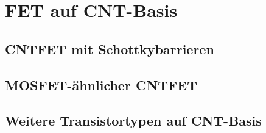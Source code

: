 \section{FET auf CNT-Basis}
\label{cha:fetaufcntbasis}

\subsection{CNTFET mit Schottkybarrieren}
\label{cntfetmitschottkybarrieren}

\subsection{MOSFET-ähnlicher CNTFET}
\label{mosfetaehnlichecntfets}

\subsection{Weitere Transistortypen auf CNT-Basis}
\label{weiteretransistortypenaufcntBasis}